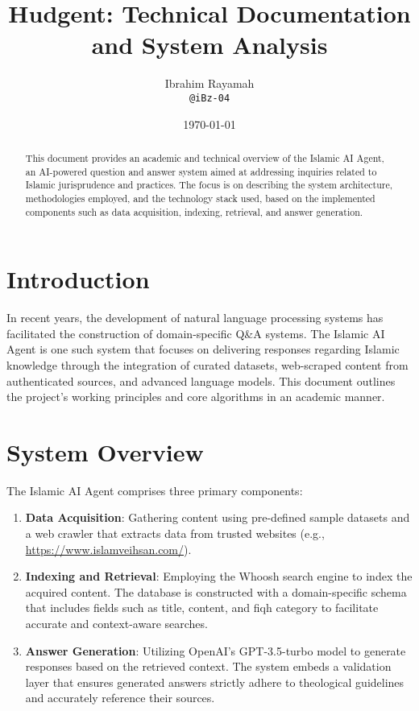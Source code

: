 \documentclass[12pt,a4paper]{article}
\title{Hudgent: Technical Documentation and System Analysis}
\author{Ibrahim Rayamah \\ \texttt{@iBz-04}}
\date{\today}
\begin{document}
\maketitle

\begin{abstract}
This document provides an academic and technical overview of the Islamic AI Agent, an AI-powered question and answer system aimed at addressing inquiries related to Islamic jurisprudence and practices. The focus is on describing the system architecture, methodologies employed, and the technology stack used, based on the implemented components such as data acquisition, indexing, retrieval, and answer generation. 
\end{abstract}

\section{Introduction}
In recent years, the development of natural language processing systems has facilitated the construction of domain-specific Q\&A systems. The Islamic AI Agent is one such system that focuses on delivering responses regarding Islamic knowledge through the integration of curated datasets, web-scraped content from authenticated sources, and advanced language models. This document outlines the project's working principles and core algorithms in an academic manner.

\section{System Overview}
The Islamic AI Agent comprises three primary components:
\begin{enumerate}
    \item \textbf{Data Acquisition}: Gathering content using pre-defined sample datasets and a web crawler that extracts data from trusted websites (e.g., \url{https://www.islamveihsan.com/}).
    \item \textbf{Indexing and Retrieval}: Employing the Whoosh search engine to index the acquired content. The database is constructed with a domain-specific schema that includes fields such as title, content, and fiqh category to facilitate accurate and context-aware searches.
    \item \textbf{Answer Generation}: Utilizing OpenAI's GPT-3.5-turbo model to generate responses based on the retrieved context. The system embeds a validation layer that ensures generated answers strictly adhere to theological guidelines and accurately reference their sources.
\end{enumerate}
\end{document}
